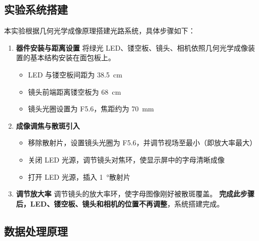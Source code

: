 


\clearpage
{}


\subsection{实验系统搭建}

本实验根据几何光学成像原理搭建光路系统，具体步骤如下：

\begin{enumerate}
    \item \textbf{器件安装与距离设置}
    将绿光 LED、镂空板、镜头、相机依照几何光学成像装置的基本结构安装在面包板上。
    \begin{itemize}
        \item LED 与镂空板间距为 \SI{38.5}{cm}
        \item 镜头前端距离镂空板为 \SI{68}{cm}
        \item 镜头光圈设置为 F5.6，焦距约为 \SI{70}{mm}
    \end{itemize}

    \item \textbf{成像调焦与散斑引入}
    \begin{itemize}
        \item 移除散射片，设置镜头光圈为 F5.6，并调节视场至最小（即放大率最大）
        \item 关闭 LED 光源，调节镜头对焦环，使显示屏中的字母清晰成像
        \item 打开 LED 光源，插入 \SI{1}{\degree}散射片
    \end{itemize}

    \item \textbf{调节放大率}
    调节镜头的放大率环，使字母图像刚好被散斑覆盖。
    \textbf{完成此步骤后，LED、镂空板、镜头和相机的位置不再调整}，系统搭建完成。
\end{enumerate}



\subsection{数据处理原理}


